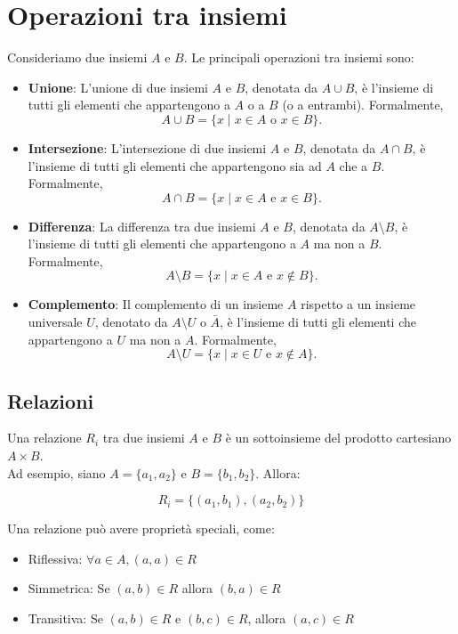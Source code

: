 \documentclass{article}
\begin{document}
\section{Operazioni tra insiemi}
Consideriamo due insiemi \( A \) e \( B \). Le principali operazioni tra
insiemi sono:
\begin{itemize}
	\item \textbf{Unione}: L'unione di due insiemi \( A \) e \( B \), denotata da \( A \cup B \),
	      è l'insieme di tutti gli elementi che appartengono a \( A \) o a \( B \) (o a entrambi). Formalmente,
	      \[
		      A \cup B = \{ x \mid x \in A \text{ o } x \in B \}.
	      \]

	\item \textbf{Intersezione}: L'intersezione di due insiemi \( A \) e \( B \), denotata da
	      \( A \cap B \), è l'insieme di tutti gli elementi che appartengono sia ad \( A \) che a \( B \). Formalmente,
	      \[
		    
		      A \cap B = \{ x \mid x \in A \text{ e } x \in B \}.
	      \]

	\item \textbf{Differenza}: La differenza tra due insiemi \( A \) e \( B \), denotata da
	      \( A \setminus B \), è l'insieme di tutti gli elementi che appartengono a \( A \) ma non a \( B \). Formalmente,
	      \[
		      A \setminus B = \{ x \mid x \in A \text{ e } x \notin B \}.
	      \]

	\item \textbf{Complemento}: Il complemento di un insieme \( A \) rispetto a un insieme
	      universale \( U \), denotato da \( A\setminus U \) o \( \bar{A} \), è l'insieme di tutti
	      gli elementi che appartengono a \( U \) ma non a \( A \). Formalmente,
	      \[
		      A\setminus U = \{ x \mid x \in U \text{ e } x \notin A \}.
	      \]
\end{itemize}

\subsection{Relazioni}

		Una relazione $R_i$ tra due insiemi $A$ e $B$ è un sottoinsieme del prodotto
cartesiano $A \times B$.\\ Ad esempio, siano $A = \{a_1, a_2\}$ e $B = \{b_1,
	b_2\}$. Allora:

\[
	R_i = \{(a_1, b_1), (a_2, b_2)\}
\]

Una relazione può avere proprietà speciali, come:
\begin{itemize}
	\item Riflessiva: $\forall a \in A, (a, a) \in R$
	\item Simmetrica: Se $(a, b) \in R$ allora $(b, a) \in R$
	\item Transitiva: Se $(a, b) \in R$ e $(b, c) \in R$, allora $(a, c) \in R$
\end{itemize}
\end{document}
